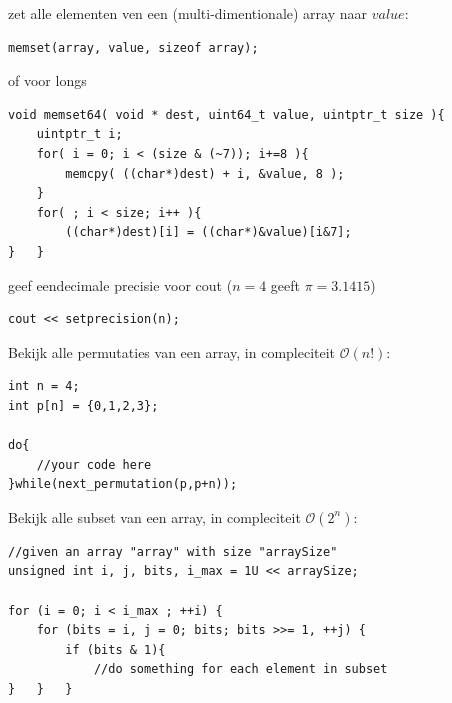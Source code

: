 \documentclass[10pt,a4paper,titlepage]{article}
\renewcommand{\O}{\mathcal{O}}
\begin{document}
zet alle elementen ven een (multi-dimentionale) array naar $value$:
\begin{lstlisting}
memset(array, value, sizeof array);
\end{lstlisting}
of voor longs
\begin{lstlisting}
void memset64( void * dest, uint64_t value, uintptr_t size ){
	uintptr_t i;
	for( i = 0; i < (size & (~7)); i+=8 ){
		memcpy( ((char*)dest) + i, &value, 8 );
	}
	for( ; i < size; i++ ){
		((char*)dest)[i] = ((char*)&value)[i&7];
}	}
\end{lstlisting}

geef eendecimale precisie voor cout ($n=4$ geeft $\pi = 3.1415$)
\begin{lstlisting}
cout << setprecision(n);
\end{lstlisting}

Bekijk alle permutaties van een array, in compleciteit $\O(n!)$:
\begin{lstlisting}
int n = 4;
int p[n] = {0,1,2,3};	

do{
	//your code here
}while(next_permutation(p,p+n));
\end{lstlisting}

Bekijk alle subset van een array, in compleciteit $\O(2^n)$:
\begin{lstlisting}
//given an array "array" with size "arraySize"
unsigned int i, j, bits, i_max = 1U << arraySize;
	
for (i = 0; i < i_max ; ++i) {
	for (bits = i, j = 0; bits; bits >>= 1, ++j) {
		if (bits & 1){
			//do something for each element in subset
}	}	}
\end{lstlisting}

\iffalse
\end{document}
